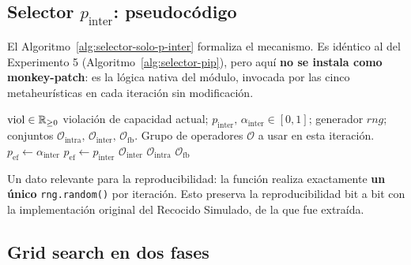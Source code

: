 \subsection{Selector \texorpdfstring{$p_{\text{inter}}$}{p\_inter}: pseudocódigo}

El Algoritmo~\ref{alg:selector-solo-p-inter} formaliza el mecanismo.
Es idéntico al del Experimento 5 (Algoritmo~\ref{alg:selector-pip}),
pero aquí \textbf{no se instala como monkey-patch}: es la lógica
nativa del módulo, invocada por las cinco metaheurísticas en cada
iteración sin modificación.

\begin{algorithm}[h]
\caption{Selector $p_{\text{inter}}$ probabilístico nativo
         (\texttt{seleccionar\_grupo\_operadores\_inter\_intra}).}
\label{alg:selector-solo-p-inter}
\begin{algorithmic}[1]
\Require $\mathrm{viol} \in \mathbb{R}_{\ge 0}$ violación de capacidad actual;
  $p_{\text{inter}},\,\alpha_{\text{inter}} \in [0,1]$;
  generador $rng$;
  conjuntos $\mathcal{O}_{\text{intra}},\,\mathcal{O}_{\text{inter}},\,\mathcal{O}_{\text{fb}}$.
\Ensure Grupo de operadores $\mathcal{O}$ a usar en esta iteración.
  \State $p_{\text{ef}} \gets \alpha_{\text{inter}}$ 
\Else
  \State $p_{\text{ef}} \gets p_{\text{inter}}$ 
\EndIf
{}
  \State \Return $\mathcal{O}_{\text{inter}}$
  \State \Return $\mathcal{O}_{\text{intra}}$
\Else
  \State \Return $\mathcal{O}_{\text{fb}}$ 
\EndIf
\end{algorithmic}
\end{algorithm}

Un dato relevante para la reproducibilidad: la función realiza
exactamente \textbf{un único} \texttt{rng.random()} por iteración.
Esto preserva la reproducibilidad bit a bit con la implementación
original del Recocido Simulado, de la que fue extraída.

\subsection{Grid search en dos fases}

